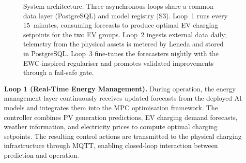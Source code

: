 \documentclass[journal]{IEEEtran}
\newcommand{\params}{\bm{\theta}}
\begin{document}
\begin{figure}[t]
\caption{System architecture. Three asynchronous loops share a common
data layer (PostgreSQL) and model registry (S3). Loop~1 runs every
15~minutes, consuming forecasts to produce optimal EV charging
setpoints for the two EV groups. Loop~2 ingests external data daily;
telemetry from the physical assets is metered by Leneda and stored in
PostgreSQL. Loop~3 fine-tunes the forecasters nightly with the
EWC-inspired regulariser and promotes validated improvements through a
fail-safe gate.}
\label{fig:overview}
\end{figure}
\textbf{Loop 1 (Real-Time Energy Management).}
During operation, the energy management layer continuously receives
updated forecasts from the deployed AI models and integrates them into
the MPC optimisation framework. The controller combines PV generation
predictions, EV charging demand forecasts, weather information, and
electricity prices to compute optimal charging setpoints. The resulting
control actions are transmitted to the physical charging infrastructure
through MQTT, enabling closed-loop interaction between prediction and
operation.
\end{document}
